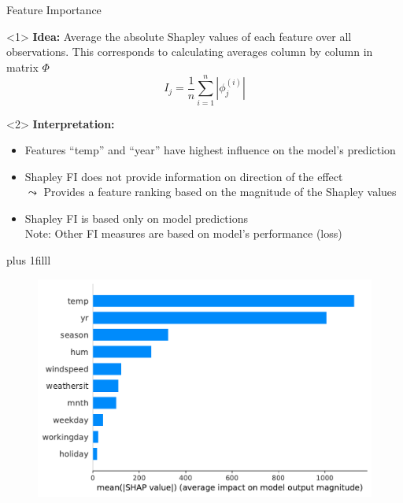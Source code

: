 \documentclass[10pt,compress,t,notes=noshow, xcolor=table]{beamer}
\newcommand{\btVFill}{\vskip0pt plus 1filll}
\begin{document}
 \begin{frame}{Feature Importance}

\begin{onlyenv}<1>
\textbf{Idea:} Average the absolute Shapley values of each feature over all observations. This corresponds to calculating averages column by column in matrix $\Phi$
$$
I_{j}=\frac{1}{n} \sum_{i=1}^{n}\left|\phi_{j}^{(i)}\right|
$$
\end{onlyenv}

\begin{onlyenv}<2>
\textbf{Interpretation:}
\begin{itemize}
    \item Features \enquote{temp} and \enquote{year} have highest influence on the model's prediction
    \item Shapley FI does not provide information on direction of the effect\\
    $\leadsto$ Provides a feature ranking based on the magnitude of the Shapley values %
    \item Shapley FI is based only on model predictions\\
    Note: Other FI measures are based on model's performance (loss)
\end{itemize}
 
\end{onlyenv}


\btVFill

\begin{figure}
    \centering
    \includegraphics[width=0.5\columnwidth]{figure_man/global_shap_fi.pdf}
\end{figure}

\end{frame}
 
\end{document}
